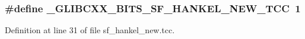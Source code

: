 \subsubsection[{\texorpdfstring{\+\_\+\+G\+L\+I\+B\+C\+X\+X\+\_\+\+B\+I\+T\+S\+\_\+\+S\+F\+\_\+\+H\+A\+N\+K\+E\+L\+\_\+\+N\+E\+W\+\_\+\+T\+CC}{_GLIBCXX_BITS_SF_HANKEL_NEW_TCC}}]{\setlength{\rightskip}{0pt plus 5cm}\#define \+\_\+\+G\+L\+I\+B\+C\+X\+X\+\_\+\+B\+I\+T\+S\+\_\+\+S\+F\+\_\+\+H\+A\+N\+K\+E\+L\+\_\+\+N\+E\+W\+\_\+\+T\+CC~1}\hypertarget{sf__hankel__new_8tcc_a3f0d94d8fb94ad2e003fd0b54ce51a6d}{}\label{sf__hankel__new_8tcc_a3f0d94d8fb94ad2e003fd0b54ce51a6d}


Definition at line 31 of file sf\+\_\+hankel\+\_\+new.\+tcc.

